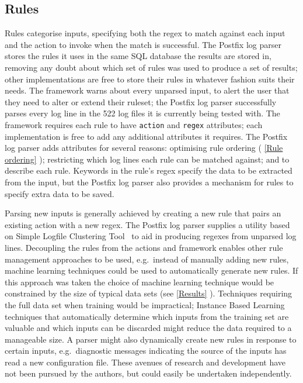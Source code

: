 \documentclass[preprint,draft,numbers,1p]{elsarticle}
\newcommand{\sectionref}[1]{%
    \textsection{}\vref*{#1}%
}
\newcommand{\numberOFlogFILESall}[0]{%
    522%
}
\begin{document}
\subsection{Rules}

\label{Rules}

Rules categorise inputs, specifying both the regex to match against each
input and the action to invoke when the match is successful.  The Postfix
log parser stores the rules it uses in the same SQL database the results
are stored in, removing any doubt about which set of rules was used to
produce a set of results; other implementations are free to store their
rules in whatever fashion suits their needs.  The framework warns about
every unparsed input, to alert the user that they need to alter or extend
their ruleset; the Postfix log parser successfully parses every log line in
the \numberOFlogFILESall{} log files it is currently being tested with.
The framework requires each rule to have \texttt{action} and \texttt{regex}
attributes; each implementation is free to add any additional attributes it
requires.  The Postfix log parser adds attributes for several reasons:
optimising rule ordering (\sectionref{Rule ordering}); restricting which
log lines each rule can be matched against; and to describe each rule.
Keywords in the rule's regex specify the data to be extracted from the
input, but the Postfix log parser also provides a mechanism for rules to
specify extra data to be saved.

Parsing new inputs is generally achieved by creating a new rule that pairs
an existing action with a new regex.  The Postfix log parser supplies a
utility based on Simple Logfile Clustering Tool~\cite{slct-paper} to aid in
producing regexes from unparsed log lines.  Decoupling the rules from the
actions and framework enables other rule management approaches to be used,
e.g.\ instead of manually adding new rules, machine learning techniques
could be used to automatically generate new rules.  If this approach was
taken the choice of machine learning technique would be constrained by the
size of typical data sets (see \sectionref{Results}).  Techniques requiring
the full data set when training would be impractical; Instance Based
Learning~\cite{instance-based-learning} techniques that automatically
determine which inputs from the training set are valuable and which inputs
can be discarded might reduce the data required to a manageable size.  A
parser might also dynamically create new rules in response to certain
inputs, e.g.\ diagnostic messages indicating the source of the inputs has
read a new configuration file.  These avenues of research and development
have not been pursued by the authors, but could easily be undertaken
independently.
\end{document}

